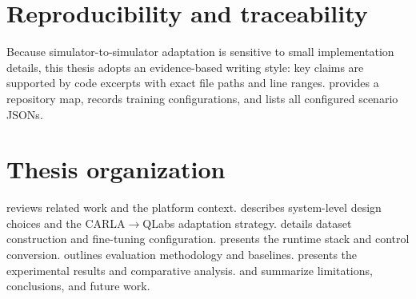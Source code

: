 \section{Reproducibility and traceability}
\label{sec:repro-trace}
Because simulator-to-simulator adaptation is sensitive to small implementation details, this thesis adopts an evidence-based writing style: key claims are supported by code excerpts with exact file paths and line ranges.  provides a repository map,  records training configurations, and  lists all configured scenario JSONs.

\section{Thesis organization}
\label{sec:thesis-org}
 reviews related work and the platform context.  describes system-level design choices and the CARLA\texorpdfstring{$\rightarrow$}{->}QLabs adaptation strategy.  details dataset construction and fine-tuning configuration.  presents the runtime stack and control conversion.  outlines evaluation methodology and baselines.  presents the experimental results and comparative analysis.  and  summarize limitations, conclusions, and future work.
